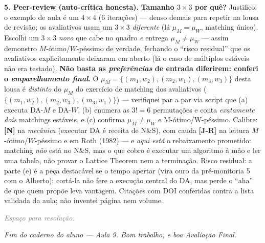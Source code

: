 \documentclass[11pt,a4paper]{article}
\newcommand{\calY}{\textbf{\textcolor{amarelo}{[N]}}} %
\newcommand{\calR}{\textbf{\textcolor{verm}{[J-R]}}}  %
\newcommand{\passo}[1]{\smallskip\noindent\textbf{\textcolor{insper}{#1}}\quad}
\newif\ifsolucao
\newcommand{\espacoaluno}[1]{%
  \par\smallskip\noindent\textit{\textcolor{gray}{Espaço para resolução.}}%
  \par\vspace{#1}\noindent\textcolor{insper!30}{\hrulefill}\par\medskip}
\begin{document}
\begin{gabarito}
\passo{5. Peer-review (auto-crítica honesta).} \textbf{Tamanho $3\times3$ por quê?} Justifico:
o exemplo de aula é um $4\times4$ (6 iterações) — denso demais para repetir na lousa de revisão;
os avaliativos usam um $3\times3$ \emph{diferente} (lá $\mu_M=\mu_W$, matching único). Escolhi um
$3\times3$ \emph{novo} que cabe no quadro \emph{e} entrega $\mu_M\ne\mu_W$ — assim demonstro
$M$-ótimo/$W$-péssimo de verdade, fechando o ``risco residual'' que os avaliativos
explicitamente deixaram em aberto (lá o caso de múltiplos estáveis não era testado).
\textbf{Não basta as \emph{preferências} de entrada diferirem: conferi o \emph{emparelhamento
final}.} O $\mu_M=\{(m_1,w_2),(m_2,w_1),(m_3,w_3)\}$ desta lousa é \emph{distinto} do $\mu_M$ do
exercício de matching dos avaliativos ($\{(m_1,w_2),(m_2,w_3),(m_3,w_1)\}$) — verifiquei par a
par via script que (a) executa DA-$M$ e DA-$W$, (b) enumera as $3!=6$ permutações e conta
\emph{exatamente dois} matchings estáveis, e (c) confirma $\mu_M\ne\mu_W$ e M-ótimo/W-péssimo.
Calibre:
\calY{} na \emph{mecânica} (executar DA é receita de N\&S), com cauda \calR{} na leitura
$M$-ótimo/$W$-péssimo e em Roth (1982) — e \emph{aqui está} o rebaixamento prometido: matching
\emph{não} está no N\&S, mas o que cobro é executar um algoritmo à mão e ler uma tabela, não
provar o Lattice Theorem nem a terminação. Risco residual: a parte (e) é a peça destacável se o
tempo apertar (vira ouro da pré-monitoria 5 com o Alberto); cortá-la não fere a execução central
do DA, mas perde o ``aha'' de que quem propõe leva vantagem. Citações com DOI conferidas contra a
lista validada da aula; não inventei página nem volume.
\end{gabarito}
\else
\espacoaluno{90mm}
\fi

\hrulefill
\begin{center}\small\textit{%
\ifsolucao Fim dos três exercícios de lousa — Aula 9. Fim do curso. Bom trabalho a todos.%
\else Fim do caderno do aluno — Aula 9. Bom trabalho, e boa Avaliação Final.\fi}\end{center}
\end{document}
